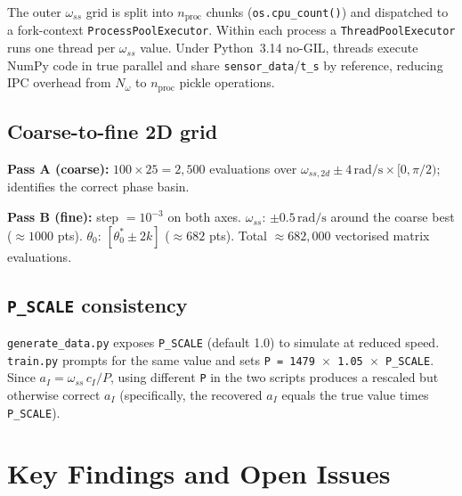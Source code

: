 \documentclass[11pt,a4paper]{article}
\begin{document}
The outer $\omega_{ss}$ grid is split into $n_{\text{proc}}$ chunks
(\texttt{os.cpu\_count()}) and dispatched to a fork-context
\texttt{ProcessPoolExecutor}.  Within each process a
\texttt{ThreadPoolExecutor} runs one thread per $\omega_{ss}$ value.
Under Python~3.14 no-GIL, threads execute NumPy code in true parallel and
share \texttt{sensor\_data}/\texttt{t\_s} by reference, reducing IPC
overhead from $N_\omega$ to $n_{\text{proc}}$ pickle operations.

\subsection{Coarse-to-fine 2D grid}

\textbf{Pass A (coarse):} $100 \times 25 = 2{,}500$ evaluations over
$\omega_{ss,2d} \pm 4\,\text{rad/s} \times [0,\pi/2)$; identifies the
correct phase basin.

\textbf{Pass B (fine):} step $= 10^{-3}$ on both axes.
$\omega_{ss}$: $\pm 0.5\,\text{rad/s}$ around the coarse best ($\approx 1000$ pts).
$\theta_0$: $[\theta_0^* \pm 2k]$ ($\approx 682$ pts).
Total $\approx 682{,}000$ vectorised matrix evaluations.

\subsection{\texttt{P\_SCALE} consistency}

\texttt{generate\_data.py} exposes \texttt{P\_SCALE} (default 1.0) to
simulate at reduced speed.  \texttt{train.py} prompts for the same value
and sets \texttt{P = 1479\,$\times$\,1.05\,$\times$\,P\_SCALE}.
Since $a_I = \omega_{ss}\,c_I/P$, using different \texttt{P} in the two
scripts produces a rescaled but otherwise correct $a_I$
(specifically, the recovered $a_I$ equals the true value times
\texttt{P\_SCALE}).

\section{Key Findings and Open Issues}
\end{document}
